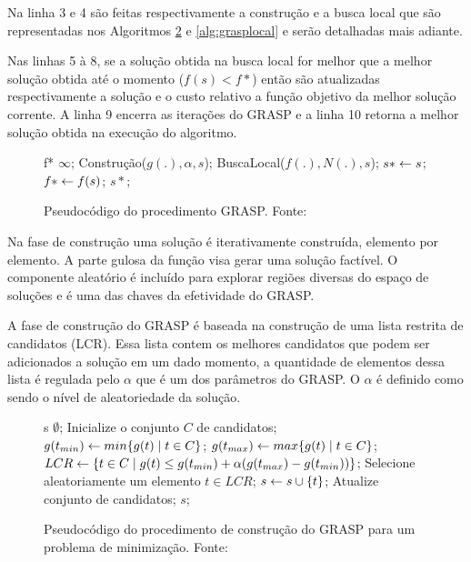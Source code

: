 Na linha 3 e 4 são feitas respectivamente a construção e a busca local que são
representadas nos Algoritmos \ref{alg:graspcons} e \ref{alg:grasplocal} e serão
detalhadas mais adiante.

Nas linhas 5 à 8, se a solução obtida na busca local for melhor que a melhor
solução obtida até o momento ($f(s) < f{*}$) então são atualizadas
respectivamente a solução e o custo relativo a função objetivo da melhor
solução corrente. A linha 9 encerra as iterações do GRASP e a linha 10 retorna a
melhor solução obtida na execução do algoritmo.

\begin{figure}[h]
\caption{Pseudocódigo do procedimento GRASP. \newline \mbox{Fonte:
\cite{resende1995}}}\label{alg:grasp}
\begin{programma}
\STATE f{*} \GETS $\infty$;
\STATE Construção($g(.), \alpha, s$);
\STATE BuscaLocal($f(.),N(.),s$);
\STATE $s{*} \leftarrow s$;
\STATE $f{*} \leftarrow f(s)$;
\ENDIF
\ENDFOR
\STATE\RETURN $s{*}$;
\ENDALGORITHM
\end{programma}
\end{figure}

Na fase de construção uma solução é iterativamente construída, elemento por
elemento. A parte gulosa da função visa gerar uma solução factível. O
componente aleatório é incluído para explorar regiões diversas do espaço de
soluções e é uma das chaves da efetividade do GRASP.

A fase de construção do GRASP é baseada na construção de uma lista restrita de
candidatos (LCR). Essa lista contem os melhores candidatos que podem ser
adicionados a solução em um dado momento, a quantidade de elementos dessa lista
é regulada pelo $\alpha$ que é um dos parâmetros do GRASP. O $\alpha$ é
definido como sendo o nível de aleatoriedade da solução.

\begin{figure}[h]
\caption{Pseudocódigo do procedimento de construção do GRASP para um problema
de minimização. \newline \mbox{Fonte:
\cite{resende1995}}}\label{alg:graspcons}
\begin{programma}
\STATE s \GETS $\emptyset$;
\STATE Inicialize o conjunto $C$ de candidatos;
\STATE $g(t_{min}) \leftarrow min\{g(t) \mid t \in C\}$;
\STATE $g(t_{max}) \leftarrow max\{g(t) \mid t \in C\}$;
\STATE $LCR \leftarrow \{t \in C \mid g(t) \leq g(t_{min}) + \alpha(g(t_{max}) - g(t_{min}))\}$;
\STATE Selecione aleatoriamente um elemento $t \in LCR$;
\STATE $s \leftarrow s \cup \{t\}$;
\STATE Atualize conjunto de candidatos;
\ENDWHILE
\STATE\RETURN $s$;
\ENDALGORITHM
\end{programma}
\end{figure}

